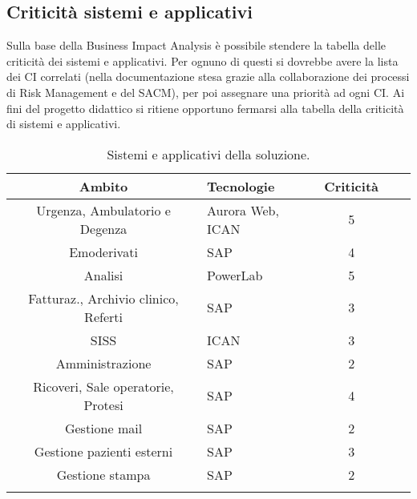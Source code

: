\newpage
\subsection{Criticità sistemi e applicativi}
\label{critsisapp}
Sulla base della Business Impact Analysis è possibile stendere la tabella delle criticità dei sistemi e applicativi. Per ognuno di questi si dovrebbe avere la lista dei CI correlati (nella documentazione stesa grazie alla collaborazione dei processi di Risk Management e del SACM), per poi assegnare una priorità ad ogni CI. Ai fini del progetto didattico si ritiene opportuno fermarsi alla tabella della criticità di sistemi e applicativi.

        \renewcommand\arraystretch{1.5}
        \begin{longtable}{c l c c c}
        \toprule
        \textbf{Ambito} & \textbf{Tecnologie} & \textbf{Criticità} \\
        \toprule
            \small{Urgenza, Ambulatorio e Degenza} & Aurora Web, ICAN &  5 \\
             Emoderivati & SAP & 4 \\
             Analisi & PowerLab & 5 \\
             \small{Fatturaz., Archivio clinico, Referti} & SAP &  3 \\
             SISS & ICAN & 3 \\
             Amministrazione & SAP & 2 \\
             \small{Ricoveri, Sale operatorie, Protesi} & SAP &  4 \\
             Gestione mail & SAP & 2 \\
             Gestione pazienti esterni & SAP  & 3 \\
             Gestione stampa & SAP & 2 \\
            \bottomrule
            \caption{Sistemi e applicativi della soluzione.}
        \end{longtable}


\newpage
